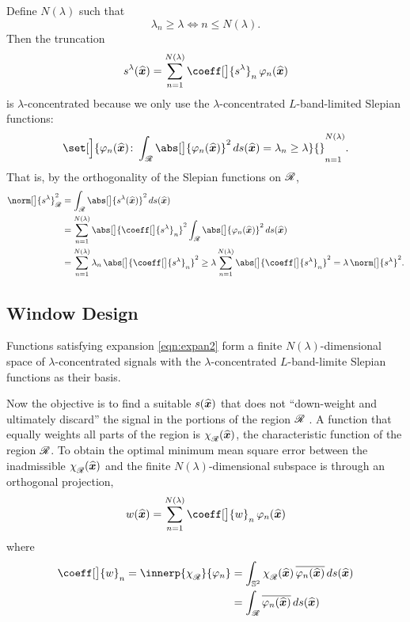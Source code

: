 \documentclass[10pt, twocolumn, twoside]{IEEEtran}
\newcommand{\untsph}{\mathbb{S}^{2}} %
\newcommand{\unit}[1]{\widehat{\bm{#1}}}
\newcommand{\conj}[1]{\overline{#1}} %
\begin{document}
\begin{bibunit}
Define $N(\lambda)$ such that
\begin{equation}
\label{eqn:lambda}
\lambda_{n}\geq \lambda \iff n\leq N(\lambda).
\end{equation}
Then the truncation
\begin{equation}
\label{eqn:expan2}
\bandt(\unit{x}) =
\sum_{n=1}^{N(\lambda)} \coeff[\big]{\bandt}_n\,\varphi_n(\unit{x})
\end{equation}
is $\lambda$-concentrated because we only use the $\lambda$-concentrated $L$-band-limited Slepian functions:
\[
\set[\Big]{\varphi_n(\unit{x})\colon
\int_{\R}\abs[\big]{\varphi_n(\unit{x})}^2\,ds(\unit{x}) = \lambda_n \geq \lambda}{\vphantom{\sum}}_{n=1}^{N(\lambda)}.
\]
That is, by the orthogonality of the Slepian functions on $\mathscr{R}$,
\begin{align*}
\norm[\big]{\bandt}_{\R}^2 &= \int_{\R} \abs[\big]{\bandt(\unit{x})}^{2}\,ds(\unit{x}) \\
&= \sum_{n=1}^{N(\lambda)} \abs[\big]{\coeff[\big]{\bandt}_n}^{2}
\int_{\R}\abs[\big]{\varphi_n(\unit{x})}^2\,ds(\unit{x}) \\
&= \sum_{n=1}^{N(\lambda)} \lambda_{n}\,\abs[\big]{\coeff[\big]{\bandt}_n}^{2}
\geq \lambda\sum_{n=1}^{N(\lambda)}\abs[\big]{\coeff[\big]{\bandt}_n}^{2} = \lambda\, \norm[\big]{\bandt}^2.
\end{align*}

\subsection{Window Design}

Functions satisfying expansion \eqref{eqn:expan2} form a finite $N(\lambda)$-dimensional space of $\lambda$-concentrated signals with the $\lambda$-concentrated $L$-band-limite Slepian functions as their basis.

Now the objective is to find a suitable $\band(\unit{x})$ that does not ``down-weight and ultimately discard'' the signal in the portions of the region $\mathscr{R}$ \cite{Wieczorek:2005}.  A function that equally weights all parts of the region is $\chi_{\R}^{\vphantom{g}}(\unit{x})$, the characteristic function of the region $\mathscr{R}$.  To obtain the optimal minimum mean square error between the inadmissible $\chi_{\R}^{\vphantom{g}}(\unit{x})$ and the finite $N(\lambda)$-dimensional subspace is through an orthogonal projection,
\begin{equation}
\taper(\unit{x}) = \sum_{n=1}^{N(\lambda)} \coeff[\big]{\taper}_n\,\varphi_n(\unit{x})
\end{equation}
where
\begin{align}
\coeff[\big]{\taper}_n = \innerp{\chi_{\R}^{\vphantom{g}}}{\varphi_n}
&= \int_{\untsph} \chi_{\R}^{\vphantom{g}}(\unit{x})\, \conj{\varphi_n(\unit{x})}\,ds(\unit{x}) \nonumber \\
&= \int_{\R} \conj{\varphi_n(\unit{x})}\,ds(\unit{x})
\end{align}


\end{bibunit}
\end{document}
